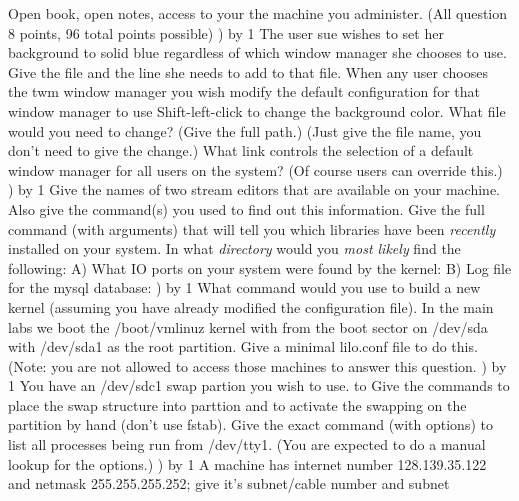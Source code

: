 
\parindent=0in
\nopagenumbers
\newcount\quesno
{}
\def\ques{\number\quesno) \advance\quesno by 1}
\def\aspace{\vskip 1.5in}

Open book, open notes, access to your the machine you administer.
(All question 8 points, 96 total points possible)
\hfill\break
\ques
The user {\ltt{}sue} wishes to set her background to {\ltt{}solid blue}
regardless of which window manager she chooses to use.
Give the file and the line she needs to add to that file.
\vskip 0.6in
When any user chooses the {\ltt{}twm} window 
manager you wish modify the default configuration for that window manager
to use {\ltt{}Shift-left-click} to change the background color.
What file would you need to change? (Give the full path.)
(Just give the file name, you don't need to give the change.)
\vskip 0.4in
What link controls the selection of a default window manager for
all users on the system? (Of course users can override this.)
\vskip 0.4in
\ques
Give the names of two stream editors that are available on your machine.
Also give the command(s) you used to find out this information.
\vskip 0.8in
Give the full command (with arguments) that will tell you which libraries have
been {\it recently} installed on your system.
\vskip 0.4in
In what {\it directory} would you {\it most likely} find
the following:
\hfill\break
A) What IO ports on your system were found by the kernel:
\vskip 0.3in
B) Log file for the mysql database:
\vskip 0.3in
\ques
What command would you use to build a new kernel (assuming you have
already modified the configuration file).
\vskip 0.4in
In the main labs we boot the {\ltt{}/boot/vmlinuz} kernel with
from the boot sector on {\ltt{}/dev/sda} with {\ltt{}/dev/sda1}
as the root partition.
Give a minimal {\ltt{}lilo.conf} file to do this.
(Note: you are not allowed to access those machines to answer this question.
\vskip 1.4in
\vfill\eject
\ques
You have an {\ltt{}/dev/sdc1} swap partion you wish to use. to
Give the commands to place the swap structure into parttion and to activate
the swapping on the partition by hand (don't use {\ltt{}fstab}).
\vskip 1.0in
Give the exact command (with options) to list all processes being run from
{\ltt{}/dev/tty1}. (You are expected to do a manual lookup for the options.)
\vskip 0.4in
\ques
A machine has internet number {\ltt{}128.139.35.122} and
netmask {\ltt{}255.255.255.252}; give it's subnet/cable number and subnet
